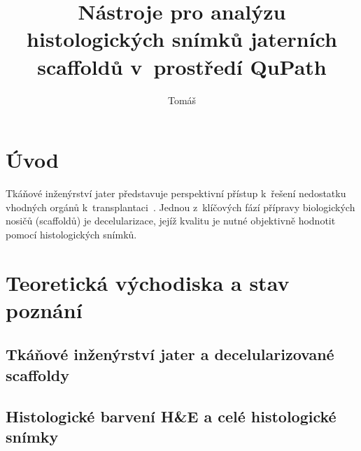 \documentclass[czech, bc, kky, he, iso690alph, pdf]{fasthesis}
\title{Nástroje pro analýzu histologických snímků jaterních scaffoldů v~prostředí QuPath}
\author{Tomáš}{Hrabák}{}{}
\begin{document}
\frontpages[tm]

\tableofcontents

%
\chapter{Úvod}


Tkáňové inženýrství jater představuje perspektivní přístup k~řešení nedostatku vhodných orgánů k~transplantaci~\cite{Moulisova2020}. Jednou z~klíčových fází přípravy biologických nosičů (scaffoldů) je decelularizace, jejíž kvalitu je nutné objektivně hodnotit pomocí histologických snímků.

%
\chapter{Teoretická východiska a stav poznání}

\section{Tkáňové inženýrství jater a decelularizované scaffoldy}

\section{Histologické barvení H\&E a celé histologické snímky}
\end{document}
